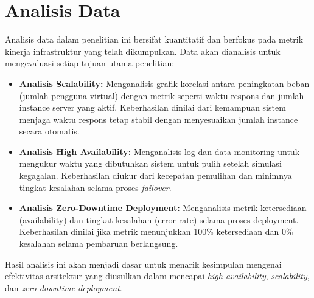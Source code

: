 \section{Analisis Data}
Analisis data dalam penelitian ini bersifat kuantitatif dan berfokus pada metrik kinerja infrastruktur yang telah dikumpulkan.
Data akan dianalisis untuk mengevaluasi setiap tujuan utama penelitian:
\begin{itemize}
    \item \textbf{Analisis Scalability:} Menganalisis grafik korelasi antara peningkatan beban (jumlah pengguna virtual) dengan metrik seperti waktu respons dan jumlah instance server yang aktif. Keberhasilan dinilai dari kemampuan sistem menjaga waktu respons tetap stabil dengan menyesuaikan jumlah instance secara otomatis.
    \item \textbf{Analisis High Availability:} Menganalisis log dan data monitoring untuk mengukur waktu yang dibutuhkan sistem untuk pulih setelah simulasi kegagalan. Keberhasilan diukur dari kecepatan pemulihan dan minimnya tingkat kesalahan selama proses \textit{failover}.
    \item \textbf{Analisis Zero-Downtime Deployment:} Menganalisis metrik ketersediaan (availability) dan tingkat kesalahan (error rate) selama proses deployment. Keberhasilan dinilai jika metrik menunjukkan 100\% ketersediaan dan 0\% kesalahan selama pembaruan berlangsung.
\end{itemize}
Hasil analisis ini akan menjadi dasar untuk menarik kesimpulan mengenai efektivitas arsitektur yang diusulkan dalam mencapai \textit{high availability}, \textit{scalability}, dan \textit{zero-downtime deployment}.
